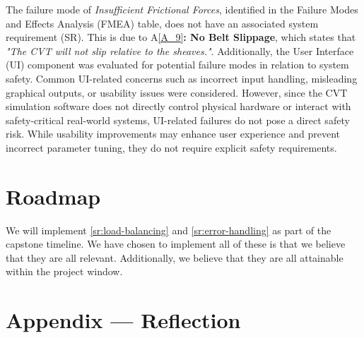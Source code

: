 \documentclass{article}
\begin{document}
\noindent The failure mode of \textit{Insufficient Frictional Forces}, identified in the Failure Modes and Effects Analysis (FMEA) table, does not have an associated system requirement (SR). 
This is due to A\ref{A_9}\textbf{: No Belt Slippage}, which states that \textit{"The CVT will not slip relative to the sheaves."}. 
Additionally, the User Interface (UI) component was evaluated for potential failure modes in relation to system safety. Common UI-related concerns such as incorrect input handling, misleading graphical outputs, or usability issues were considered. However, since the CVT simulation software does not directly control physical hardware or interact with safety-critical real-world systems, UI-related failures do not pose a direct safety risk.
While usability improvements may enhance user experience and prevent incorrect parameter tuning, they do not require explicit safety requirements.  

\section{Roadmap}

We will implement \ref{sr:load-balancing} and \ref{sr:error-handling} as part of the capstone timeline.
We have chosen to implement all of these is that we believe that they are all relevant.
Additionally, we believe that they are all attainable within the project window.

\newpage{}

\section*{Appendix --- Reflection}


\end{document}
